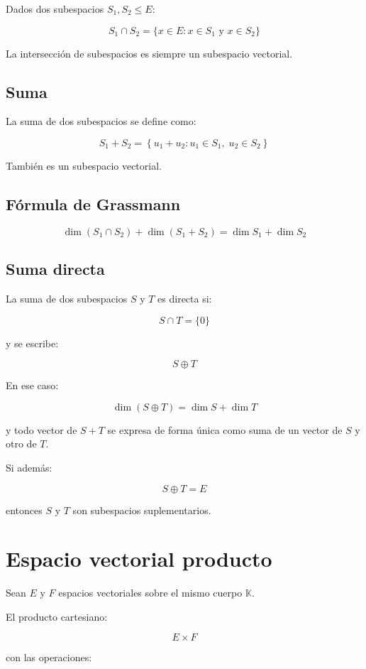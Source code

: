 \documentclass[11pt,a4paper]{article}
\newcommand{\K}{\mathbb{K}}
\newcommand{\dimn}{\operatorname{dim}}
\begin{document}
Dados dos subespacios $S_1,S_2\leq E$:

\[
S_1\cap S_2
=
\{x\in E:
x\in S_1
\text{ y }
x\in S_2
\}
\]

La intersección de subespacios es siempre un subespacio vectorial.

\subsection{Suma}

La suma de dos subespacios se define como:

\[
S_1+S_2
=
\left\{
u_1+u_2:
u_1\in S_1,\;
u_2\in S_2
\right\}
\]

También es un subespacio vectorial.

\subsection{Fórmula de Grassmann}

\[
\boxed{
\dimn(S_1\cap S_2)
+
\dimn(S_1+S_2)
=
\dimn S_1
+
\dimn S_2
}
\]

\subsection{Suma directa}

La suma de dos subespacios $S$ y $T$ es directa si:

\[
S\cap T=\{0\}
\]

y se escribe:

\[
S\oplus T
\]

En ese caso:

\[
\dimn(S\oplus T)
=
\dimn S+\dimn T
\]

y todo vector de $S+T$ se expresa de forma única como suma de un vector de $S$ y otro de $T$.

Si además:

\[
S\oplus T=E
\]

entonces $S$ y $T$ son subespacios suplementarios.

\section{Espacio vectorial producto}

Sean $E$ y $F$ espacios vectoriales sobre el mismo cuerpo $\K$.

El producto cartesiano:

\[
E\times F
\]

con las operaciones:
\end{document}
